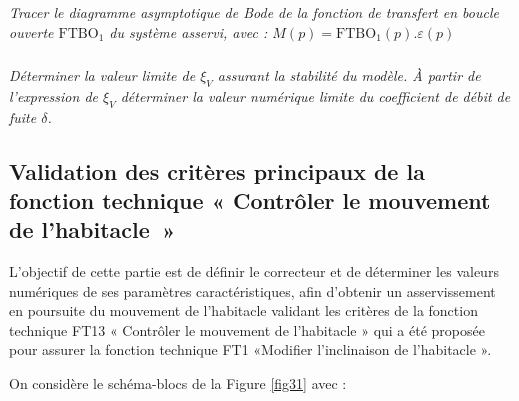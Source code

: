\begin{multicols}{2}
\begin{multicols}{2}
\subparagraph{}\textit{Tracer le diagramme asymptotique de Bode de la fonction de transfert en boucle ouverte $\text{FTBO}_1$ du système asservi, avec : $M(p)=\text{FTBO}_1(p).\varepsilon(p)$}
\ifprof
\begin{corrige}
\end{corrige}
\else
\fi

\subparagraph{}\textit{Déterminer la valeur limite de $\xi_V$ assurant la stabilité du modèle. À partir de l'expression de $\xi_V$ déterminer la valeur numérique limite du coefficient de débit de fuite $\delta$.}
\ifprof
\begin{corrige}
\end{corrige}
\else
\fi

%


\subsection*{Validation des critères principaux de la fonction technique « Contrôler le mouvement de l'habitacle~»}



\begin{obj}
L'objectif de cette partie est de définir le correcteur et de déterminer les valeurs numériques de ses paramètres caractéristiques, afin d'obtenir un asservissement en poursuite du mouvement de l'habitacle validant les critères de la fonction technique FT13 « Contrôler le mouvement de l'habitacle » qui a été proposée pour assurer la fonction technique FT1 «Modifier l'inclinaison de l'habitacle ».
\end{obj}




On considère le schéma-blocs de la Figure \ref{fig31} avec :
 	 		 		 

\end{multicols}
\end{multicols}
